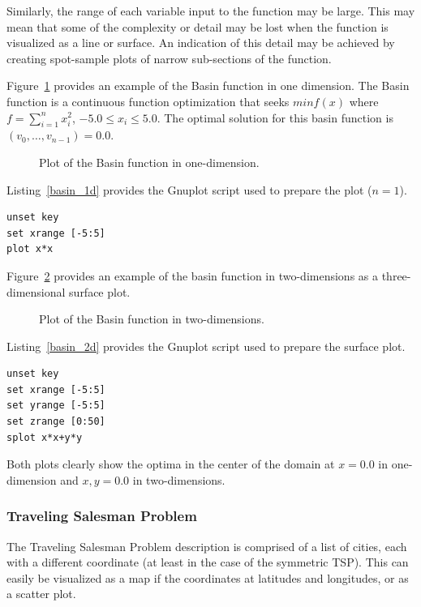 Similarly, the range of each variable input to the function may be large. This may mean that some of the complexity or detail may be lost when the function is visualized as a line or surface. An indication of this detail may be achieved by creating spot-sample plots of narrow sub-sections of the function. 

Figure~\ref{plot:basin1} provides an example of the Basin function in one dimension. The Basin function is a  continuous function optimization that seeks $min f(x)$ where $f=\sum_{i=1}^n x_{i}^2$, $-5.0\leq x_i \leq 5.0$. The optimal solution for this basin function is $(v_0,\ldots,v_{n-1})=0.0$. 

\begin{figure}[htp]
\centering

\caption{Plot of the Basin function in one-dimension.}
\label{plot:basin1}
\end{figure}

Listing~\ref{basin_1d} provides the Gnuplot script used to prepare the plot ($n=1$).

\begin{lstlisting}[caption=Gnuplot script for plotting the Basin function in one-dimension., label=basin_1d]
unset key
set xrange [-5:5]
plot x*x
\end{lstlisting}

Figure~\ref{plot:basin2} provides an example of the basin function in two-dimensions as a three-dimensional surface plot.

\begin{figure}[htp]
\centering

\caption{Plot of the Basin function in two-dimensions.}
\label{plot:basin2}
\end{figure}

Listing~\ref{basin_2d} provides the Gnuplot script used to prepare the surface plot.

\begin{lstlisting}[caption=Gnuplot script for plotting the Basin function in two-dimensions, label=basin_2d]
unset key
set xrange [-5:5]
set yrange [-5:5]
set zrange [0:50]
splot x*x+y*y
\end{lstlisting}

Both plots clearly show the optima in the center of the domain at $x=0.0$ in one-dimension and $x,y=0.0$ in two-dimensions.

\subsubsection{Traveling Salesman Problem}
The Traveling Salesman Problem description is comprised of a list of cities, each with a different coordinate (at least in the case of the symmetric TSP). This can easily be visualized as a map if the coordinates at latitudes and longitudes, or as a scatter plot.


